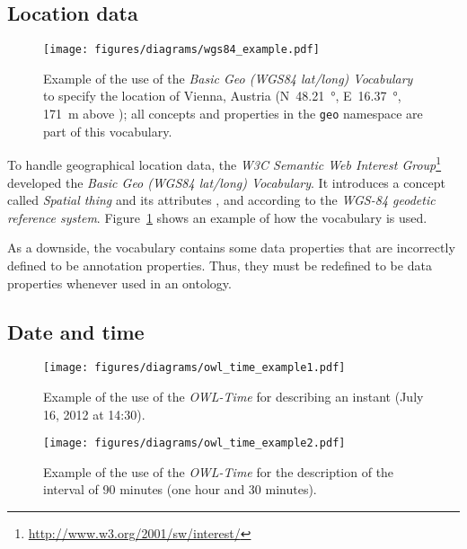 \subsection{Location data}
\label{subsec:location_ontologies}


\begin{figure}
\centering
\texttt{[image: figures/diagrams/wgs84\_example.pdf]}
\caption{Example of the use of the \emph{Basic Geo (WGS84 lat/long) Vocabulary} to specify the location of Vienna, Austria (N~\SI{48.21}{\degree}, E~\SI{16.37}{\degree}, \SI{171}{\metre} above ); all concepts and properties in the \texttt{geo} namespace are part of this vocabulary.}
\label{fig:wgs84_example}
\end{figure}

To handle geographical location data, the \emph{W3C Semantic Web Interest Group}\footnote{\href{http://www.w3.org/2001/sw/interest/}{http://www.w3.org/2001/sw/interest/}} developed the \emph{Basic Geo (WGS84 lat/long) Vocabulary}\cite{wgs84_vocabulary}. It introduces a concept called \emph{Spatial thing} and its attributes ,  and  according to the \emph{WGS-84 geodetic reference system}\cite{WGS84}. Figure~\ref{fig:wgs84_example} shows an example of how the vocabulary is used.

As a downside, the vocabulary contains some data properties that are incorrectly defined to be annotation properties. Thus, they must be redefined to be data properties whenever used in an  ontology.

\subsection{Date and time}
\label{subsec:date_ontologies}

\begin{figure}
\centering
\texttt{[image: figures/diagrams/owl\_time\_example1.pdf]}
\caption{Example of the use of the \emph{OWL-Time} for describing an instant (July 16, 2012 at 14:30).}
\label{fig:owl_time_example1}
\end{figure}

\begin{figure}
\centering
\texttt{[image: figures/diagrams/owl\_time\_example2.pdf]}
\caption{Example of the use of the \emph{OWL-Time} for the description of the interval of 90 minutes (one hour and 30 minutes).}
\label{fig:owl_time_example2}
\end{figure}

